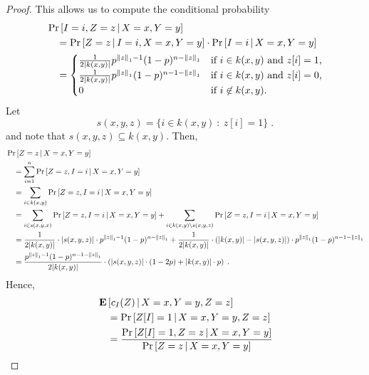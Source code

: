 \begin{proof}
This allows us to compute the conditional probability
\begin{align*}
& \Pr \left[I = i, Z = z \, \middle| \, X = x, Y = y \right] \\
& \quad = \Pr \left[Z = z \, \middle| \, I = i, X = x, Y = y \right] \cdot \Pr \left[I = i \, \middle| \, X = x, Y = y \right] \\
& \quad =
\begin{cases}
\frac{1}{2|k(x,y)|} p^{\left\| z \right\|_1 - 1} (1 - p)^{n - \left\| z \right\|_1} & \text{if $i \in k(x,y)$ and $z[i] = 1$,} \\
\frac{1}{2|k(x,y)|} p^{\left\| z \right\|_1} (1 - p)^{n - 1 - \left\| z \right\|_1} & \text{if $i \in k(x,y)$ and $z[i] = 0$,} \\
0 & \text{if $i \not \in k(x,y)$.} \\
\end{cases}
\end{align*}
Let
$$
s(x,y,z) = \{ i \in k(x,y) ~:~ z[i] = 1 \} \; .
$$
and note that $s(x,y,z) \subseteq k(x,y)$.
Then,
\begin{align*}
& \Pr \left[Z = z \, \middle| \, X = x, Y = y \right] \\
& \quad = \sum_{i=1}^n \Pr \left[Z = z, I = i \, \middle| \, X = x, Y = y \right] \\
& \quad = \sum_{i \in k(x,y)} \Pr \left[Z = z, I = i \, \middle| \, X = x, Y = y \right] \\
& \quad = \sum_{i \in s(x,y,x)} \Pr \left[Z = z, I = i \, \middle| \, X = x, Y = y \right] + \sum_{i \in k(x,y) \setminus s(x,y,z)} \Pr \left[Z = z, I = i \, \middle| \, X = x, Y = y \right] \\
& \quad = \frac{1}{2|k(x,y)|} \cdot |s(x,y,z)| \cdot p^{\left\| z \right\|_1 - 1} (1 - p)^{n - \left\| z \right\|_1} + \frac{1}{2|k(x,y)|} \cdot (|k(x,y)| - |s(x,y,z)|) \cdot p^{\left\| z \right\|_1} (1 - p)^{n - 1 - \left\| z \right\|_1} \\
& \quad = \frac{p^{\left\| z \right\|_1 - 1} (1 - p)^{n - 1 - \left\| z \right\|_1}}{2|k(x,y)|} \cdot \left( |s(x,y,z)| \cdot (1 - 2p) + |k(x,y)| \cdot p \right) \; .
\end{align*}
Hence,
\begin{align*}
& \Exp\left[ c_I(Z) \, \middle| \, X = x, Y = y, Z = z \right] \\
& \quad = \Pr \left[ Z[I] = 1 \, \middle| \, X = x, Y = y, Z = z \right] \\
& \quad = \frac{\displaystyle \Pr \left[ Z[I] = 1, Z = z \, \middle| \, X = x, Y = y \right]}{\displaystyle \Pr \left[ Z = z \, \middle| \, X = x, Y = y \right]} \\

\end{align*}
\end{proof}
